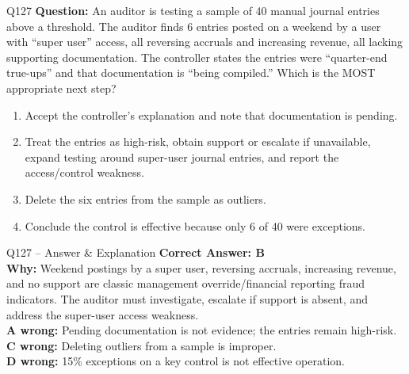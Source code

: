 \documentclass[aspectratio=169,10pt]{beamer}
\begin{document}
	\begin{frame}[t]{Q127}
		\small
		\textbf{Question:} An auditor is testing a sample of 40 manual journal entries above a threshold. The auditor finds 6 entries posted on a weekend by a user with ``super user'' access, all reversing accruals and increasing revenue, all lacking supporting documentation. The controller states the entries were ``quarter-end true-ups'' and that documentation is ``being compiled.'' Which is the MOST appropriate next step?
		\begin{enumerate}[label=\Alph*.,itemsep=1pt,topsep=2pt]
			\item Accept the controller's explanation and note that documentation is pending.
			\item Treat the entries as high-risk, obtain support or escalate if unavailable, expand testing around super-user journal entries, and report the access/control weakness.
			\item Delete the six entries from the sample as outliers.
			\item Conclude the control is effective because only 6 of 40 were exceptions.
		\end{enumerate}
	\end{frame}
	
	\begin{frame}[t]{Q127 -- Answer \& Explanation}
		\small
		\textbf{Correct Answer: B} \\[4pt]
		\textbf{Why:} Weekend postings by a super user, reversing accruals, increasing revenue, and no support are classic management override/financial reporting fraud indicators. The auditor must investigate, escalate if support is absent, and address the super-user access weakness. \\[4pt]
		\textbf{A wrong:} Pending documentation is not evidence; the entries remain high-risk. \\[2pt]
		\textbf{C wrong:} Deleting outliers from a sample is improper. \\[2pt]
		\textbf{D wrong:} 15\% exceptions on a key control is not effective operation.
	\end{frame}
	
\end{document}
